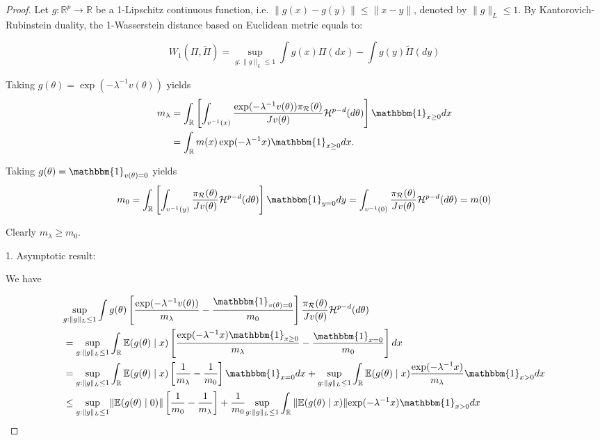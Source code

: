 \documentclass[10pt]{article}
\newcommand{\mc}[1]{\mathcal{#1}}
\DeclareMathOperator{\1}{\mathbbm{1}}
\begin{document}
\begin{proof}[Proof]
Let $g:\mathbb{R}^p\rightarrow \mathbb{R}$ be a 1-Lipschitz continuous function, i.e. $\|g(x)-g(y)\|\le \|x-y\|$, denoted by $\|g\|_L\le 1$. 
By Kantorovich-Rubinstein duality, the 1-Wasserstein distance based on Euclidean metric equals to: 

\begin{equation}
W_1(\Pi,\tilde\Pi)=\underset{g:\|g\|_L\le 1}\sup \int g(x) \Pi(dx) -  \int g(y) \tilde\Pi(dy) 
\end{equation}

Taking $g(\theta)=\exp(-\lambda^{-1}v(\theta))$ yields
	\begin{equation}
	\begin{aligned}
	m_\lambda
	& = \int_\mathbb{R}  \left[ \int_{v^{-1}(x)} \frac{ \exp(- \lambda^{-1} v(\theta) ) \pi_{\mc R}(\theta)}{ J v(\theta) } \mathcal{H}^{p-d}(d \theta) \right] \mathbbm{1}_{x \ge 0}  d x \\
	& = \int_\mathbb{R}  m(x)\exp(- \lambda^{-1} x ) \mathbbm{1}_{x \ge 0}  d x .
		\end{aligned}
	\end{equation}
	
Taking $g(\theta)={\mathbbm{1}_{v(\theta)=0}}$ yields 
	\begin{equation}
	m_0
	= \int_\mathbb{R} \left[ \int_{v^{-1}(y)} \frac{ \pi_{\mc R}(\theta) }{ J v(\theta) } \mathcal{H}^{p-d}(d \theta) \right]\mathbbm{1}_{y=0} dy   =  \int_{v^{-1}(0)} \frac{ \pi_{\mc R}(\theta) }{ J v(\theta) } \mathcal{H}^{p-d}(d \theta) =m(0)
	\end{equation}
	
	Clearly $m_\lambda \ge m_0$.
	
1. Asymptotic result:
	
We have
	
	\begin{equation}		
	\label{wass0}
		\begin{aligned}
	&\underset{g:\|g\|_L\le 1}\sup\int g(\theta)  \left[ \frac{ \exp(- \lambda^{-1} v(\theta)) } {  m_\lambda}  - 
	 \frac{ \mathbbm{1}_{v(\theta)=0} } {  m_0} 
	\right]  \frac{\pi_{\mc R}(\theta)}{Jv(\theta)} \mc H^{p-d}(d \theta) \\
	&= \underset{g:\|g\|_L\le 1}\sup\int_\mathbb{R}  \mathbb{E}(g(\theta) \mid x)  \left[ \frac{ \exp(- \lambda^{-1} x) \mathbbm{1}_{x \ge 0}} {  m_\lambda}  - 
	 \frac{ \mathbbm{1}_{x=0} } {  m_0} 
	\right] d x \\
		&=	\underset{g:\|g\|_L\le 1}\sup\int_\mathbb{R}  \mathbb{E}(g(\theta) \mid x)  \left[ \frac{  1} {  m_\lambda}  - 
	 \frac{ 1 } {  m_0} 
	\right]\mathbbm{1}_{x=0} d x  + \underset{g:\|g\|_L\le 1}\sup\int_\mathbb{R}  \mathbb{E}(g(\theta) \mid x)\frac{ \exp(- \lambda^{-1} x)} {  m_\lambda}  
	  \mathbbm{1}_{x > 0} d x \\
	& \le \underset{g:\|g\|_L\le 1}\sup \|\mathbb{E}(g(\theta) \mid 0)\| \left[ \frac{ 1 } {  m_0} -\frac{  1} {  m_\lambda}   
	 \right] + \frac{1} {  m_0} \underset{g:\|g\|_L\le 1}\sup \int_\mathbb{R}  \|\mathbb{E}(g(\theta) \mid x)\| { \exp(- \lambda^{-1} x)}
	\mathbbm{1}_{x > 0} d x \\	
	  \end{aligned}
	  \end{equation}
	  

\end{proof}
\end{document}

